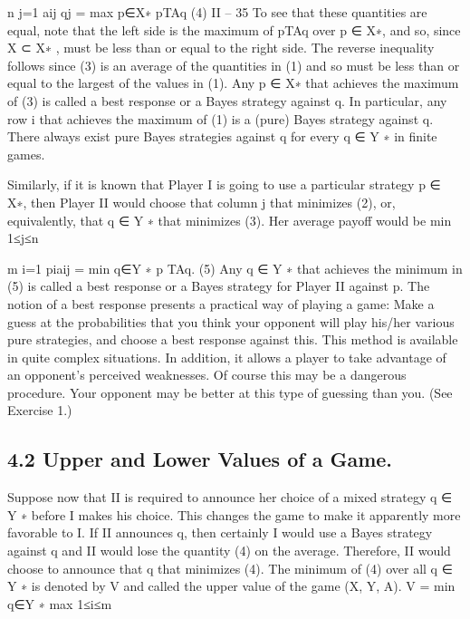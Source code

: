 \documentclass[]{report}
\begin{document}
n
j=1
aij qj = max
p∈X∗ pTAq (4)
II – 35
To see that these quantities are equal, note that the left side is the maximum of pTAq over
p ∈ X∗, and so, since X ⊂ X∗ , must be less than or equal to the right side. The reverse
inequality follows since (3) is an average of the quantities in (1) and so must be less than
or equal to the largest of the values in (1).
Any p ∈ X∗ that achieves the maximum of (3) is called a best response or a Bayes
strategy against q. In particular, any row i that achieves the maximum of (1) is a (pure)
Bayes strategy against q. There always exist pure Bayes strategies against q for every
q ∈ Y ∗ in finite games.

Similarly, if it is known that Player I is going to use a particular strategy p ∈ X∗, then
Player II would choose that column j that minimizes (2), or, equivalently, that q ∈ Y ∗
that minimizes (3). Her average payoff would be
min
1≤j≤n

m
i=1
piaij = min
q∈Y ∗ p
TAq. (5)
Any q ∈ Y ∗ that achieves the minimum in (5) is called a best response or a Bayes strategy
for Player II against p.
The notion of a best response presents a practical way of playing a game: Make a
guess at the probabilities that you think your opponent will play his/her various pure
strategies, and choose a best response against this. This method is available in quite
complex situations. In addition, it allows a player to take advantage of an opponent’s
perceived weaknesses. Of course this may be a dangerous procedure. Your opponent may
be better at this type of guessing than you. (See Exercise 1.)

\subsection{4.2 Upper and Lower Values of a Game.} Suppose now that II is required to
announce her choice of a mixed strategy q ∈ Y ∗ before I makes his choice. This changes
the game to make it apparently more favorable to I. If II announces q, then certainly I
would use a Bayes strategy against q and II would lose the quantity (4) on the average.
Therefore, II would choose to announce that q that minimizes (4). The minimum of (4)
over all q ∈ Y ∗ is denoted by V and called the upper value of the game (X, Y, A).
V = min
q∈Y ∗ max
1≤i≤m
\end{document}
